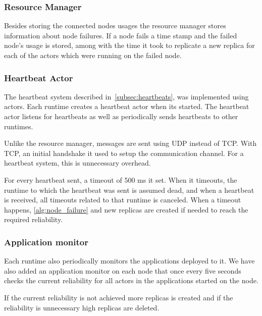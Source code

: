 \documentclass{cslthse-msc}
\begin{document}

\subsubsection{Resource Manager}
Besides storing the connected nodes usages the resource manager stores information about node failures. If a node fails a time stamp and the failed node's usage is stored, among with the time it took to replicate a new replica for each of the actors which were running on the failed node.


\subsubsection{Heartbeat Actor}
The heartbeat system described in~\cref{subsec:heartbeats}, was implemented using actors. Each runtime creates a heartbeat actor when its started. The heartbeat actor listens for heartbeats as well as periodically sends heartbeats to other runtimes.

Unlike the resource manager, messages are sent using UDP instead of TCP. With TCP, an initial handshake it used to setup the communication channel. For a heartbeat system, this is unnecessary overhead. 

For every heartbeat sent, a timeout of 500 ms it set. When it timeouts, the runtime to which the heartbeat was sent is assumed dead, and when a heartbeat is received, all timeouts related to that runtime is canceled. When a timeout happens, \cref{alg:node_failure} and new replicas are created if needed to reach the required reliability.

\subsubsection{Application monitor}
Each runtime also periodically monitors the applications deployed to it. We have also added an application monitor on each node that once every five seconds checks the current reliability for all actors in the applications started on the node. 

If the current reliability is not achieved more replicas is created and if the reliability is unnecessary high replicas are deleted.
\end{document}
